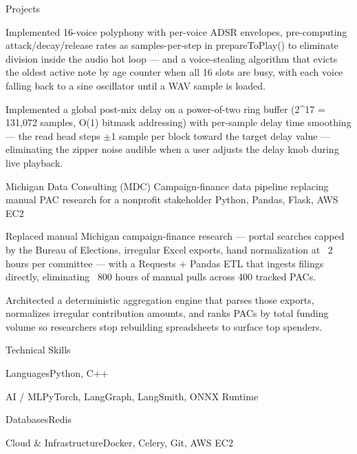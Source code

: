 \documentclass[
	11pt
]{../../../template}
\begin{document}
\begin{rSection}{P}{rojects}
\begin{rSectionEntry}
			\item Implemented 16-voice polyphony with per-voice ADSR envelopes, pre-computing attack/decay/release rates as samples-per-step in prepareToPlay() to eliminate division inside the audio hot loop --- and a voice-stealing algorithm that evicts the oldest active note by age counter when all 16 slots are busy, with each voice falling back to a sine oscillator until a WAV sample is loaded.
			\item Implemented a global post-mix delay on a power-of-two ring buffer (2\textasciicircum{}17 = 131,072 samples, O(1) bitmask addressing) with per-sample delay time smoothing --- the read head steps $\pm$1 sample per block toward the target delay value --- eliminating the zipper noise audible when a user adjusts the delay knob during live playback.
		\end{rSectionEntry}

		\begin{rSectionEntry}
			{Michigan Data Consulting (MDC)}
			{}
			{Campaign-finance data pipeline replacing manual PAC research for a nonprofit stakeholder}
			{Python, Pandas, Flask, AWS EC2}
			{}

			\item Replaced manual Michigan campaign-finance research — portal searches capped by the Bureau of Elections, irregular Excel exports, hand normalization at ~2 hours per committee — with a Requests + Pandas ETL that ingests filings directly, eliminating ~800 hours of manual pulls across 400 tracked PACs.
			\item Architected a deterministic aggregation engine that parses those exports, normalizes irregular contribution amounts, and ranks PACs by total funding volume so researchers stop rebuilding spreadsheets to surface top spenders.
		\end{rSectionEntry}
	\end{rSection}

	\begin{rSection}{T}{echnical Skills}
		\begin{rSet}{Languages}{Python, C++}
		\end{rSet}
		\begin{rSet}{AI / ML}{PyTorch, LangGraph, LangSmith, ONNX Runtime}
		\end{rSet}
		\begin{rSet}{Databases}{Redis}
		\end{rSet}
		\begin{rSet}{Cloud \& Infrastructure}{Docker, Celery, Git, AWS EC2}
		\end{rSet}
	\end{rSection}
\end{document}
